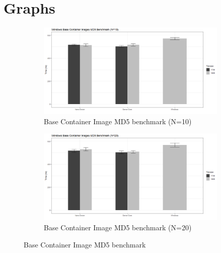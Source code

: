 \section{Graphs}
\begin{figure}[h]
	\begin{subfigure}{\textwidth}
	\captionsetup{width=0.8\linewidth}
	\includegraphics[width=0.9\linewidth]{img/Methodologie/Containers3.png}
	\centering
	\caption{Base Container Image MD5 benchmark (N=10)}
	\end{subfigure}
	\begin{subfigure}{\textwidth}
	\captionsetup{width=0.8\linewidth}
	\includegraphics[width=0.9\linewidth]{img/Methodologie/Containers1.png}
	\centering
	\caption{Base Container Image MD5 benchmark (N=20)}
	\end{subfigure}
	\label{fig:MD5Benchmark}
	\caption[MD5 benchmark]{Base Container Image MD5 benchmark}
\end{figure}

